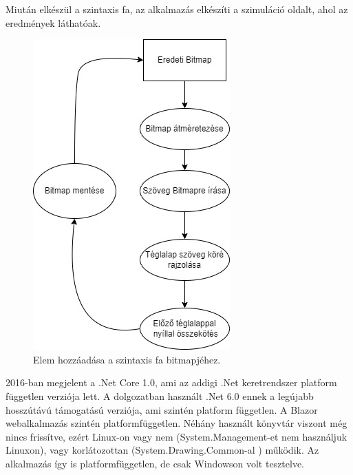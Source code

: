 Miután elkészül a szintaxis fa, az alkalmazás elkészíti a szimuláció oldalt, ahol az eredmények láthatóak.

\begin{figure}[h]
\centering
\includegraphics[scale=0.8]{images/ST.jpg}
\caption{Elem hozzáadása a szintaxis fa bitmapjéhez.}
\label{fig:st}
\end{figure}


2016-ban megjelent a .Net Core 1.0, ami az addigi .Net keretrendszer platform független verziója lett. A dolgozatban használt .Net 6.0 ennek a legújabb hosszútávú támogatású verziója, ami szintén platform független. A Blazor webalkalmazás szintén platformfüggetlen. Néhány használt könyvtár viszont még nincs  frissítve, ezért Linux-on vagy nem (System.Management-et nem használjuk Linuxon), vagy korlátozottan (System.Drawing.Common-al \cite{drawing})  működik. Az alkalmazás így is platformfüggetlen, de csak Windowson volt tesztelve.



